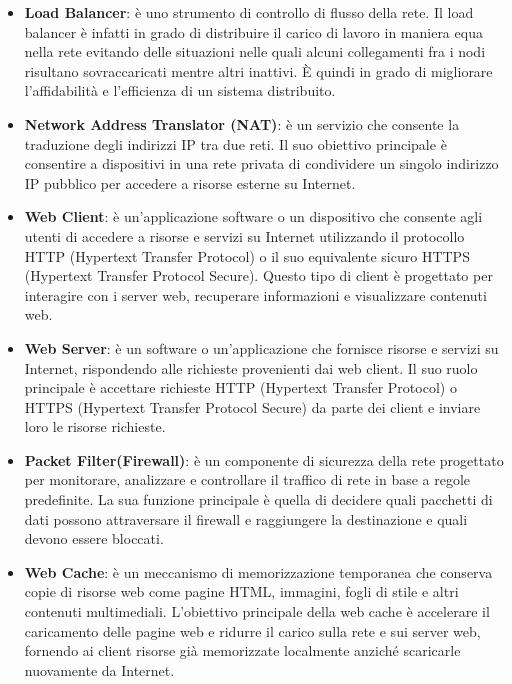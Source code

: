 \begin{itemize}
    \item \textbf{Load Balancer}: è uno strumento di controllo di flusso della rete. Il load balancer è infatti in grado di distribuire il carico di lavoro in maniera equa nella rete
        evitando delle situazioni nelle quali alcuni collegamenti fra i nodi risultano sovraccaricati mentre altri inattivi. È quindi in grado di migliorare l'affidabilità e l'efficienza di
        un sistema distribuito.
    \item \textbf{Network Address Translator (NAT)}: è un servizio che consente la traduzione degli indirizzi IP tra due reti. Il suo obiettivo principale è consentire a dispositivi in una rete 
    privata di condividere un singolo indirizzo IP pubblico per accedere a risorse esterne su Internet.  
    \item \textbf{Web Client}: è un'applicazione software o un dispositivo che consente agli utenti di accedere a risorse e servizi su Internet utilizzando il protocollo HTTP (Hypertext Transfer Protocol) o il suo equivalente sicuro HTTPS (Hypertext Transfer Protocol Secure). 
    Questo tipo di client è progettato per interagire con i server web, recuperare informazioni e visualizzare contenuti web.
    \item \textbf{Web Server}: è un software o un'applicazione che fornisce risorse e servizi su Internet, rispondendo alle richieste provenienti dai web client. Il suo ruolo principale è accettare richieste HTTP (Hypertext Transfer Protocol) o HTTPS (Hypertext Transfer Protocol Secure) 
    da parte dei client e inviare loro le risorse richieste.
    \item  \textbf{Packet Filter(Firewall)}: è un componente di sicurezza della rete progettato per monitorare, analizzare e controllare il traffico di rete in base a regole predefinite. La sua funzione principale è quella di decidere quali pacchetti di dati possono attraversare il firewall e raggiungere la destinazione e quali devono essere bloccati.
    \item  \textbf{Web Cache}: è un meccanismo di memorizzazione temporanea che conserva copie di risorse web come pagine HTML, immagini, fogli di stile e altri contenuti multimediali. L'obiettivo principale della web cache è accelerare il caricamento delle pagine web e ridurre il carico sulla rete e sui server web, fornendo ai client risorse già memorizzate localmente anziché scaricarle nuovamente da Internet.
\end{itemize}

